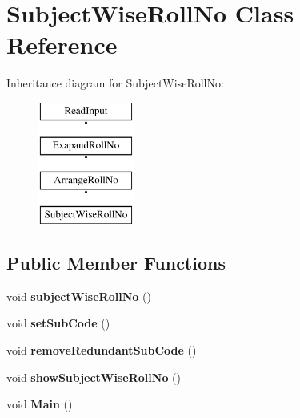 \hypertarget{classSubjectWiseRollNo}{\section{Subject\-Wise\-Roll\-No Class Reference}
\label{classSubjectWiseRollNo}
}
Inheritance diagram for Subject\-Wise\-Roll\-No\-:\begin{figure}[H]
\begin{center}
\leavevmode
\includegraphics[height=4.000000cm]{classSubjectWiseRollNo}
\end{center}
\end{figure}
\subsection*{Public Member Functions}
\begin{DoxyCompactItemize}
\item 
\hypertarget{classSubjectWiseRollNo_aface8a14361aeeb9a6127d98d60e7732}{void {\bfseries subject\-Wise\-Roll\-No} ()}\label{classSubjectWiseRollNo_aface8a14361aeeb9a6127d98d60e7732}

\item 
\hypertarget{classSubjectWiseRollNo_a243121bce1807bada075e686f740643f}{void {\bfseries set\-Sub\-Code} ()}\label{classSubjectWiseRollNo_a243121bce1807bada075e686f740643f}

\item 
\hypertarget{classSubjectWiseRollNo_acfe5a3d07cad3397efd866fb87b54db7}{void {\bfseries remove\-Redundant\-Sub\-Code} ()}\label{classSubjectWiseRollNo_acfe5a3d07cad3397efd866fb87b54db7}

\item 
\hypertarget{classSubjectWiseRollNo_adb376b81d6b5005889653332a064c977}{void {\bfseries show\-Subject\-Wise\-Roll\-No} ()}\label{classSubjectWiseRollNo_adb376b81d6b5005889653332a064c977}

\item 
\hypertarget{classSubjectWiseRollNo_aeeb07726ddfc0ec17fa8a02c5cd2ffff}{void {\bfseries Main} ()}\label{classSubjectWiseRollNo_aeeb07726ddfc0ec17fa8a02c5cd2ffff}

\end{DoxyCompactItemize}
